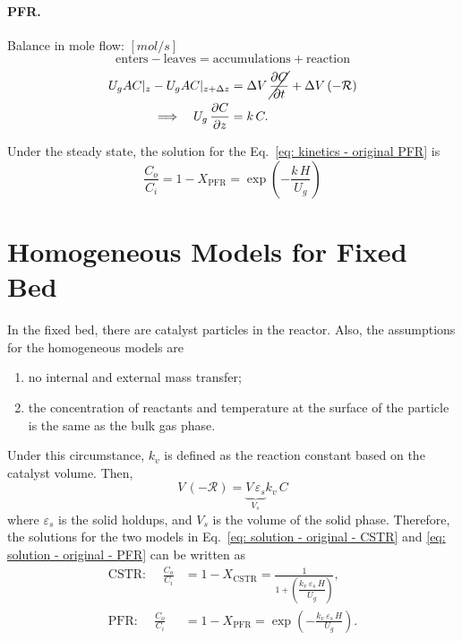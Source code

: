\paragraph{PFR. }
Balance in mole flow:
$[\si{mol/s}]$
\begin{equation*}
    \text{enters} - \text{leaves}
    = \text{accumulations} + \text{reaction}
\end{equation*}
\begin{align}
    U_g A C|_z - U_g A C|_{z+\Delta z}
     & = \Delta V \, \cancel{\frac{\partial C}{\partial t}} 
       + \Delta V \,(\mathcal{-R})\\
    \Longrightarrow \quad
    U_g \, \frac{\partial C}{\partial z}
     & = k\,C.
    \label{eq: kinetics - original PFR}
\end{align}

Under the steady state, the solution for the Eq.~\eqref{eq: kinetics - original PFR} is 
\begin{equation}
    \frac{C_o}{C_i} = 1-X_\text{PFR} 
    = \exp{\left( -\frac{k\, H}{U_g} \right)}
    \label{eq: solution - original - PFR}
\end{equation}

\section{Homogeneous Models for Fixed Bed}
In the fixed bed, there are catalyst particles in the reactor.  
Also, the assumptions for the homogeneous models are 
\begin{enumerate}
    \item no internal and external mass transfer;
    \item the concentration of reactants and temperature at the surface of the particle is the same as the bulk gas phase.
\end{enumerate}
Under this circumstance, $k_v$ is defined as the reaction constant based on the catalyst volume. 
Then, 
\begin{equation}
    V \,(\mathcal{-R}) 
    = \underbrace{V \, \varepsilon_s}_{V_s} k_v\,C
\end{equation}
where $\varepsilon_s$ is the solid holdups, 
and $V_s$ is the volume of the solid phase. 
Therefore, the solutions for the two models in Eq.~\eqref{eq: solution - original - CSTR} and \eqref{eq: solution - original - PFR} can be written as 
\begin{align}
    \text{CSTR: }\quad
    \frac{C_o}{C_i} &= 1-X_\text{CSTR} 
    = \frac{1}
    {1+\left(\dfrac{k_v\, \varepsilon_s \, H}{U_g}\right)},
    \\
    \text{PFR: }\quad
    \frac{C_o}{C_i} &= 1-X_\text{PFR} 
    = \exp{\left( -\frac{k_v\, \varepsilon_s \, H}{U_g} \right)}.
\end{align}

